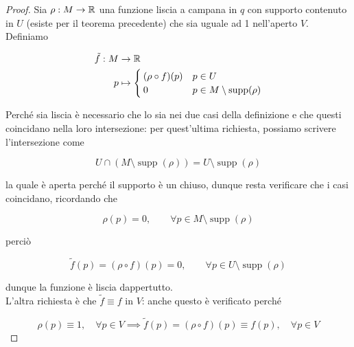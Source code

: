 \begin{proof}
	Sia $ \rho : M \to \mathbb{R} $ una funzione liscia a campana in $ q $ con supporto contenuto in $ U $ (esiste per il teorema precedente) che sia uguale ad 1 nell'aperto $ V $.\\
	Definiamo
	
	\begin{align}
		\begin{split}
			\tilde{f} : M &\to \R\\
			p &\mapsto %
			\begin{cases}
				(\rho \circ f)(p) & p \in U\\
				0 & p \in M \setminus \operatorname{supp}(\rho)
			\end{cases}
		\end{split}
	\end{align}

	Perché sia liscia è necessario che lo sia nei due casi della definizione e che questi coincidano nella loro intersezione: per quest'ultima richiesta, possiamo scrivere l'intersezione come
	
	\begin{equation}
		U \cap (M \setminus \operatorname{supp}(\rho)) = U \setminus \operatorname{supp}(\rho)
	\end{equation}

	la quale è aperta perché il supporto è un chiuso, dunque resta verificare che i casi coincidano, ricordando che
	
	\begin{equation}
		\rho(p) = 0, \qquad \forall p \in M \setminus \operatorname{supp}(\rho)
	\end{equation}

	perciò
	
	\begin{equation}
		\tilde{f}(p) = (\rho \circ f)(p) = 0, \qquad \forall p \in U \setminus \operatorname{supp}(\rho)
	\end{equation}

	dunque la funzione è liscia dappertutto.\\
	L'altra richiesta è che $ \tilde{f} \equiv f $ in $ V $: anche questo è verificato perché
	
	\begin{equation}
		\rho(p) \equiv 1, \quad \forall p \in V \implies \tilde{f}(p) = (\rho \circ f)(p) \equiv f(p), \quad \forall p \in V
	\end{equation}
\end{proof}

